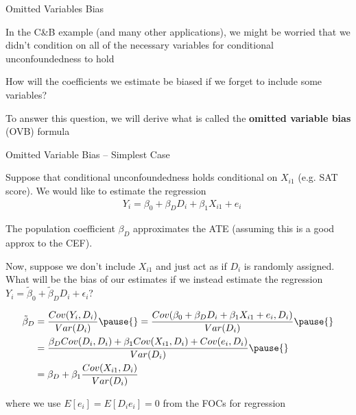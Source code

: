 \documentclass[11pt,english,handout]{beamer}
\newenvironment{wideitemize}{\itemize\addtolength{\itemsep}{10pt}}{\enditemize}
\begin{document}


\begin{frame}{Omitted Variables Bias}
	\begin{wideitemize}
		\item
		In the C\&B example (and many other applications), we might be worried that we didn't condition on all of the necessary variables for conditional unconfoundedness to hold
		
		\pause
		\item
		How will the coefficients we estimate be biased if we forget to include some variables? 
		
		\pause
		\item
		To answer this question, we will derive what is called the \textbf{omitted variable bias} (OVB) formula
	\end{wideitemize}
\end{frame}


\begin{frame}{Omitted Variable Bias -- Simplest Case}
\begin{wideitemize}
	\item
	Suppose that conditional unconfoundedness holds conditional on $X_{i1}$ (e.g. SAT score). \pause{} 
	We would like to estimate the regression
	\begin{align*}
		& Y_i = \beta_0 + \beta_{D} D_i + \beta_{1} X_{i1}+e_i
	\end{align*}

	\noindent 
	The population coefficient $\beta_{D}$ approximates the ATE (assuming this is a good approx to the CEF).
	
	\item
	Now, suppose we don't include $X_{i1}$ and just act as if $D_i$ is randomly assigned. \pause
	What will be the bias of our estimates if we instead estimate the regression $Y_i = \tilde\beta_0 + \tilde\beta_{D} D_i + \epsilon_i$?
	
	\pause
	\begin{align*}
		\tilde\beta_D&=\frac{Cov(Y_i,D_i)}{Var(D_i)} \pause{}=\frac{Cov( \beta_0 + \beta_{D} D_i + \beta_{1} X_{i1}+e_i,D_i)}{Var(D_i)} \pause{}\\
&=\frac{\beta_{D}Cov( D_i,D_i) + \beta_{1} Cov(X_{i1},D_i)+Cov(e_i,D_i)}{Var(D_i)} \pause{}\\
&=\beta_D+\beta_1\frac{Cov(X_{i1},D_i)}{Var(D_i)}
	\end{align*}

\noindent where we use $E[e_i] = E[D_i e_i] = 0$ from the FOCs for regression
\end{wideitemize}	
	
\end{frame}
\end{document}
